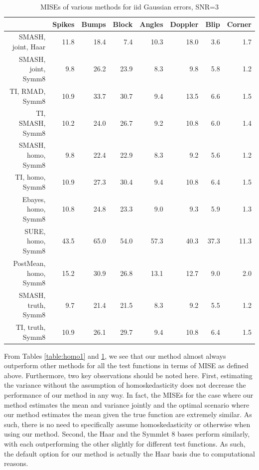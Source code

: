 \documentclass[12pt]{article}
\begin{document}
\begin{table}[ht]
\centering
\begin{tabular}{rrrrrrrr}
  \hline
 & Spikes & Bumps & Block & Angles & Doppler & Blip & Corner \\
  \hline
SMASH, joint, Haar & 11.8 & 18.4 & 7.4 & 10.3 & 18.0 & 3.6 & 1.7 \\
  SMASH, joint, Symm8 & 9.8 & 26.2 & 23.9 & 8.3 & 9.8 & 5.8 & 1.2 \\
  TI, RMAD, Symm8 & 10.9 & 33.7 & 30.7 & 9.4 & 13.5 & 6.6 & 1.5 \\
  TI, SMASH, Symm8 & 10.2 & 24.0 & 26.7 & 9.2 & 10.8 & 6.0 & 1.4 \\
  SMASH, homo, Symm8 & 9.8 & 22.4 & 22.9 & 8.3 & 9.2 & 5.6 & 1.2 \\
  TI, homo, Symm8 & 10.9 & 27.3 & 30.4 & 9.4 & 10.8 & 6.4 & 1.5 \\
  Ebayes, homo, Symm8 & 10.8 & 24.8 & 23.3 & 9.0 & 9.3 & 5.9 & 1.3 \\
  SURE, homo, Symm8 & 43.5 & 65.0 & 54.0 & 57.3 & 40.3 & 37.3 & 11.3 \\
  PostMean, homo, Symm8 & 15.2 & 30.9 & 26.8 & 13.1 & 12.7 & 9.0 & 2.0 \\
  SMASH, truth, Symm8 & 9.7 & 21.4 & 21.5 & 8.3 & 9.2 & 5.5 & 1.2 \\
  TI, truth, Symm8 & 10.9 & 26.1 & 29.7 & 9.4 & 10.8 & 6.4 & 1.5 \\
   \hline
\end{tabular}
\caption{MISEs of various methods for iid Gaussian errors, SNR=3}
\label{table:homo3}
\end{table}
From Tables \ref{table:homo1} and \ref{table:homo3}, we see that our method almost always outperform other methods for all the test functions in terms of MISE as defined above. Furthermore, two key observations should be noted here. First, estimating the variance without the assumption of homoskedasticity does not decrease the performance of our method in any way. In fact, the MISEs for the case where our method estimates the mean and variance jointly and the optimal scenario where our method estimates the mean given the true function are extremely similar. As such, there is no need to specifically assume homoskedasticity or otherwise when using our method. Second, the Haar and the Symmlet 8 bases perform similarly, with each outperforming the other slightly for different test functions. As such, the default option for our method is actually the Haar basis due to computational reasons. \bigskip\\
\end{document}
